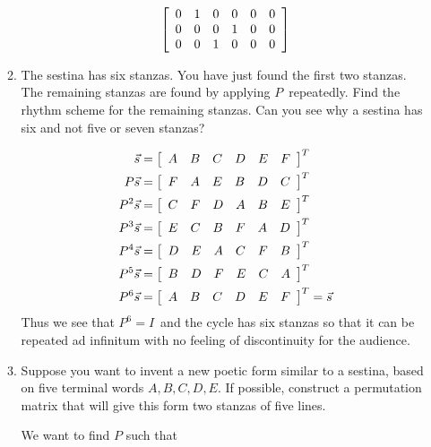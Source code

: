 \documentclass{letter}
\newcommand{\Vn}[1]{\vec{#1}}
\newcommand{\?}{\stackrel{?}{=}}
\newcommand\Que[1]{%
   \leavevmode\noindent
   #1
}
\newcommand\Ans[2][]{%
   \leavevmode\noindent
   {
       \begin{mdframed}[backgroundcolor=blue!10]
       #2
       \end{mdframed}
   }
}
\newenvironment{Mat}[1]{%
  \left[\begin{array}{*{#1}{r}}
}{%
  \end{array}\right]
}
\begin{document}
\begin{enumerate}
\begin{enumerate}[label=(\alph*)]
{\begin{align*}
\begin{Mat}{6}
                         0 & 1 & 0 & 0 & 0 & 0 \\
                         0 & 0 & 0 & 1 & 0 & 0 \\
                         0 & 0 & 1 & 0 & 0 & 0 \end{Mat}
    \end{align*}
    }
    \item \Que{
       The sestina has six stanzas.  You have just found the first two stanzas.  The remaining stanzas are found by applying $P$\ repeatedly.  Find the rhythm scheme for the remaining stanzas.  Can you see why a sestina has six and not five or seven stanzas?
    }
    \Ans{
      \begin{align*}
        \Vn{s}    &= \begin{Mat}{6} A & B & C & D & E & F \end{Mat}^T \\
        P\Vn{s}   &= \begin{Mat}{6} F & A & E & B & D & C \end{Mat}^T \\
        P^2\Vn{s} &= \begin{Mat}{6} C & F & D & A & B & E \end{Mat}^T \\
        P^3\Vn{s} &= \begin{Mat}{6} E & C & B & F & A & D \end{Mat}^T \\
        P^4\Vn{s} &= \begin{Mat}{6} D & E & A & C & F & B \end{Mat}^T \\
        P^5\Vn{s} &= \begin{Mat}{6} B & D & F & E & C & A \end{Mat}^T \\
        P^6\Vn{s} &= \begin{Mat}{6} A & B & C & D & E & F \end{Mat}^T = \Vn{s}                
      \end{align*}
      Thus we see that $P^6=I$\ and the cycle has six stanzas so that it can be repeated ad infinitum with no feeling of discontinuity for the audience.
    }
    \newpage
    \item \Que{
        Suppose you want to invent a new poetic form similar to a sestina, based on five terminal words $A,B,C,D,E$.  If possible, construct a permutation matrix that will give this form two stanzas of five lines. 
    }
    \Ans{
    We want to find $P$ such that
}
\end{enumerate}
\end{enumerate}
\end{document}
